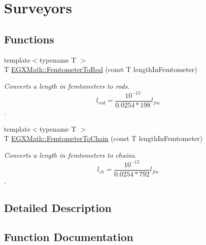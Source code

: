 \hypertarget{group___e_g_x_math-_conversions-_length_conversions-_s_i-_femtometer-_surveyors}{}\section{Surveyors}
\label{group___e_g_x_math-_conversions-_length_conversions-_s_i-_femtometer-_surveyors}
\subsection*{Functions}
\begin{DoxyCompactItemize}
\item 
{\footnotesize template$<$typename T $>$ }\\T \mbox{\hyperlink{group___e_g_x_math-_conversions-_length_conversions-_s_i-_femtometer-_surveyors_ga29f133c21de5eca2aa12f88caf6da86f}{E\+G\+X\+Math\+::\+Femtometer\+To\+Rod}} (const T length\+In\+Femtometer)
\begin{DoxyCompactList}\small\item\em Converts a length in femtometers to rods. \[ l_{rod}= \frac{10^{-15}}{0.0254 * 198} l_{fm} \]. \end{DoxyCompactList}\item 
{\footnotesize template$<$typename T $>$ }\\T \mbox{\hyperlink{group___e_g_x_math-_conversions-_length_conversions-_s_i-_femtometer-_surveyors_gac3220ddaefa889db44eb85690203f345}{E\+G\+X\+Math\+::\+Femtometer\+To\+Chain}} (const T length\+In\+Femtometer)
\begin{DoxyCompactList}\small\item\em Converts a length in femtometers to chains. \[ l_{ch}= \frac{10^{-15}}{0.0254 * 792} l_{fm} \]. \end{DoxyCompactList}\end{DoxyCompactItemize}


\subsection{Detailed Description}


\subsection{Function Documentation}
\mbox{\label{group___e_g_x_math-_conversions-_length_conversions-_s_i-_femtometer-_surveyors_gac3220ddaefa889db44eb85690203f345}} 
